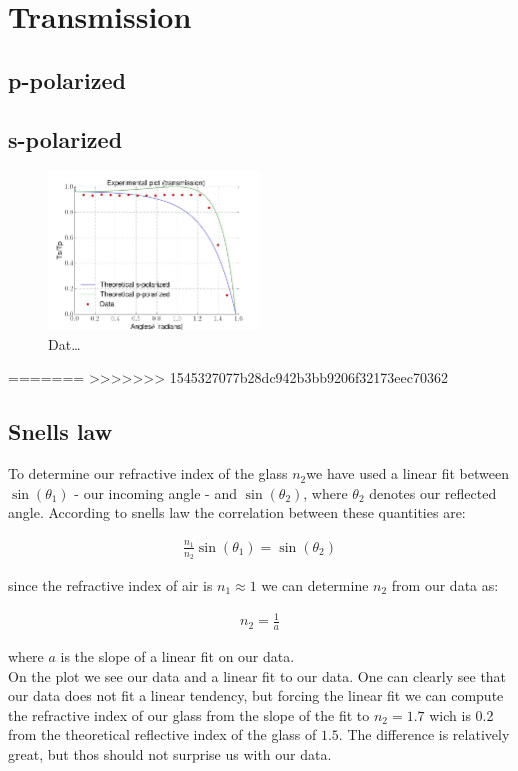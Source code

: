 \section{Transmission}
\subsection{p-polarized}
\subsection{s-polarized}
\begin{figure}[h]
    \centering
    \includegraphics[width=0.5\textwidth]{transmission}
    \caption{Dat\ldots}
    \label{fig:transmission}
\end{figure}
=======
>>>>>>> 1545327077b28dc942b3bb9206f32173eec70362

\subsection{Snells law}

To determine our refractive index of the glass $n_2$we have used a linear fit between $\sin(\theta_1)$ - our incoming angle - and $\sin(\theta_2)$, where $\theta_2$ denotes our reflected angle. According to snells law the correlation between these quantities are:

\begin{align}
\frac{n_1}{n_2}\sin(\theta_1)=\sin(\theta_2)
\end{align}

since the refractive index of air is $n_1 \approx 1$ we can determine $n_2$ from our data as:

\begin{align}
n_2=\frac{1}{a}
\end{align}

where $a$ is the slope of a linear fit on our data. \\

On the plot we see our data and a linear fit to our data. One can clearly see that our data does not fit a linear tendency, but forcing the linear fit we can compute the refractive index of our glass from the slope of the fit to $n_2=1.7$ wich is 0.2 from the theoretical reflective index of the glass of $1.5$. The difference is relatively great, but thos should not surprise us with our data. 

